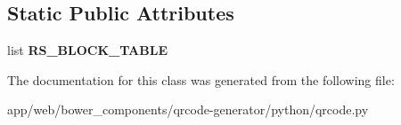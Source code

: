 \subsection*{Static Public Attributes}
\begin{DoxyCompactItemize}
\item 
\mbox{\label{classqrcode_1_1_r_s_block_a0d5fd2f0ac563832188a36ebfcf87b55}} 
list {\bfseries R\+S\+\_\+\+B\+L\+O\+C\+K\+\_\+\+T\+A\+B\+LE}
\end{DoxyCompactItemize}


The documentation for this class was generated from the following file\+:\begin{DoxyCompactItemize}
\item 
app/web/bower\+\_\+components/qrcode-\/generator/python/qrcode.\+py\end{DoxyCompactItemize}
